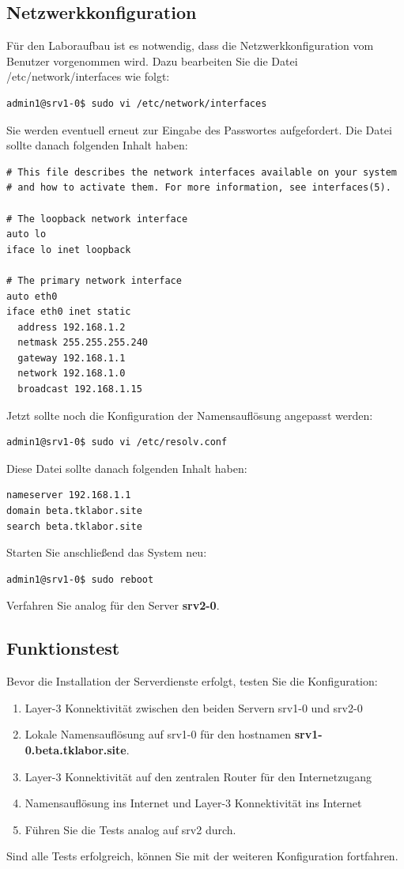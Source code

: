 \subsection{Netzwerkkonfiguration}
Für den Laboraufbau ist es notwendig, dass die Netzwerkkonfiguration vom
Benutzer vorgenommen wird. Dazu bearbeiten Sie die Datei /etc/network/interfaces
wie folgt:
\begin{lstlisting}
admin1@srv1-0$ sudo vi /etc/network/interfaces
\end{lstlisting}
Sie werden eventuell erneut zur Eingabe des Passwortes aufgefordert. Die Datei
sollte danach folgenden Inhalt haben:
\begin{lstlisting}
# This file describes the network interfaces available on your system
# and how to activate them. For more information, see interfaces(5).

# The loopback network interface
auto lo
iface lo inet loopback

# The primary network interface
auto eth0
iface eth0 inet static
  address 192.168.1.2
  netmask 255.255.255.240
  gateway 192.168.1.1
  network 192.168.1.0
  broadcast 192.168.1.15
\end{lstlisting}
Jetzt sollte noch die Konfiguration der Namensauflösung angepasst werden:
\begin{lstlisting}
admin1@srv1-0$ sudo vi /etc/resolv.conf
\end{lstlisting}
Diese Datei sollte danach folgenden Inhalt haben:
\begin{lstlisting}
nameserver 192.168.1.1
domain beta.tklabor.site
search beta.tklabor.site
\end{lstlisting}
Starten Sie anschließend das System neu:
\begin{lstlisting}
admin1@srv1-0$ sudo reboot
\end{lstlisting}
Verfahren Sie analog für den Server \textbf{srv2-0}.

\subsection{Funktionstest}
Bevor die Installation der Serverdienste erfolgt, testen Sie die Konfiguration:
\begin{enumerate}
  \item Layer-3 Konnektivität zwischen den beiden Servern srv1-0 und srv2-0
  \item Lokale Namensauflösung auf srv1-0 für den hostnamen
  \textbf{srv1-0.beta.tklabor.site}.
  \item Layer-3 Konnektivität auf den zentralen Router für den Internetzugang
  \item Namensauflösung ins Internet und Layer-3 Konnektivität ins Internet
  \item Führen Sie die Tests analog auf srv2 durch.
\end{enumerate}

Sind alle Tests erfolgreich, können Sie mit der weiteren Konfiguration
fortfahren.
